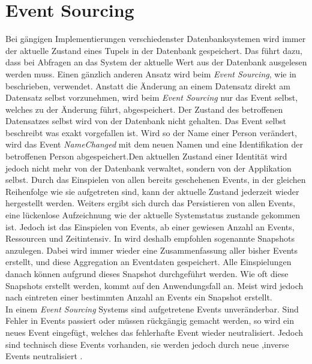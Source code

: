 \section{Event Sourcing}
Bei gängigen Implementierungen verschiedenster Datenbanksystemen wird immer der aktuelle Zustand eines Tupels in der Datenbank gespeichert. Das führt dazu, dass bei Abfragen an das System der aktuelle Wert aus der Datenbank ausgelesen werden muss. Einen gänzlich anderen Ansatz wird beim \textit{Event Sourcing}, wie in \cite{vernon2013implementing} beschrieben, verwendet. Anstatt die Änderung an einem Datensatz direkt am Datensatz selbst vorzunehmen, wird beim \textit{Event Sourcing} nur das Event selbst, welches zu der Änderung führt, abgespeichert. Der Zustand des betroffenen Datensatzes selbst wird von der Datenbank nicht gehalten. Das Event selbst beschreibt was exakt vorgefallen ist. Wird so der Name einer Person verändert, wird das Event \textit{NameChanged} mit dem neuen Namen und eine Identifikation der betroffenen Person abgespeichert.Den aktuellen Zustand einer Identität wird jedoch nicht mehr von der Datenbank verwaltet, sondern von der Applikation selbst. Durch das Einspielen von allen bereits geschehenen Events, in der gleichen Reihenfolge wie sie aufgetreten sind, kann der aktuelle Zustand jederzeit wieder hergestellt werden. Weiters ergibt sich durch das Persistieren von allen Events, eine lückenlose Aufzeichnung wie der aktuelle Systemstatus zustande gekommen ist. \cite{vernon2013implementing} 
Jedoch ist das Einspielen von Events, ab einer gewiesen Anzahl an Events, Ressourcen und Zeitintensiv. In \cite{vernon2013implementing} wird deshalb empfohlen sogenannte Snapshots  anzulegen. Dabei wird immer wieder eine Zusammenfassung aller bisher Events erstellt, und diese Aggregation an Eventdaten gespeichert.  Alle Einspielungen danach können aufgrund dieses Snapshot durchgeführt werden. Wie oft diese Snapshots erstellt werden, kommt auf den Anwendungsfall an. Meist wird jedoch nach eintreten einer bestimmten Anzahl an Events ein Snapshot erstellt. \\
In einem  \textit{Event Sourcing} Systems sind aufgetretene Events unveränderbar. Sind Fehler in Events passiert oder müssen rückgängig gemacht werden, so wird ein neues Event eingefügt, welches das fehlerhafte Event wieder neutralisiert. Jedoch sind technisch diese Events vorhanden, sie werden jedoch durch neue ,inverse Events  neutralisiert \citep{vernon2013implementing}. 
